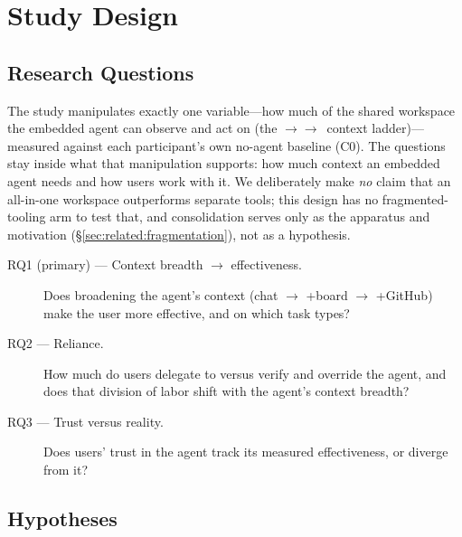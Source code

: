 \section{Study Design}
\label{sec:study}

\subsection{Research Questions}
\label{sec:study:rqs}

The study manipulates exactly one variable---how much of the shared workspace
the embedded agent can observe and act on (the \CI$\to$\CII$\to$\CIII\ context
ladder)---measured against each participant's own no-agent baseline (C0). The
questions stay inside what that manipulation supports: how much context an
embedded agent needs and how users work with it. We deliberately make
\emph{no} claim that an all-in-one workspace outperforms separate tools; this
design has no fragmented-tooling arm to test that, and consolidation serves
only as the apparatus and motivation (\S\ref{sec:related:fragmentation}), not
as a hypothesis.

\begin{description}
  \item[RQ1 (primary) --- Context breadth $\to$ effectiveness.]
    Does broadening the agent's context (chat $\to$ +board $\to$ +GitHub) make
    the user more effective, and on which task types?

  \item[RQ2 --- Reliance.]
    How much do users delegate to versus verify and override the agent, and
    does that division of labor shift with the agent's context breadth?

  \item[RQ3 --- Trust versus reality.]
    Does users' trust in the agent track its measured effectiveness, or diverge
    from it?
\end{description}

\subsection{Hypotheses}
\label{sec:study:hypotheses}


